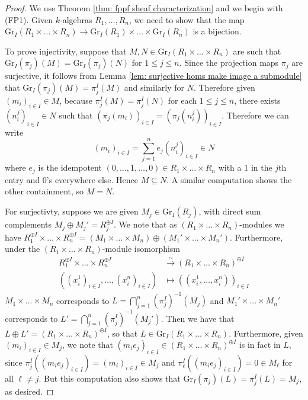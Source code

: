 \documentclass[oneside,11pt]{amsart}
\newcommand{\Gr}{\ensuremath{\text{Gr}}}
\theoremstyle{definition}
\newtheorem{proof techniques}{Proof Techniques}
\begin{document}
\begin{proof}
We use Theorem \ref{thm: fppf sheaf characterization} and we begin with (FP1). Given $k$-algebras $R_1, \ldots,  R_n$, we need to show that the map $\Gr_I( R_1 \times \ldots \times R_n ) \to \Gr_I( R_1) \times \ldots \times \Gr_I(R_n )$ is a bijection. 

To prove injectivity, suppose that $M , N \in \Gr_I( R_1 \times \ldots \times R_n )$ are such that $\Gr_I( \pi_j )(M) = \Gr_I( \pi_j )(N)$ for $1 \leq j \leq n$. Since the projection maps $\pi_j$ are surjective, it follows from Lemma \ref{lem: surjective homs make image a submodule} that $\Gr_I( \pi_j )(M) = \pi_j^I (M)$ and similarly for $N$. Therefore given $(m_i)_{i \in I} \in M$, because $\pi_j^I (M) = \pi_j^I (N)$ for each $1 \leq j \leq n$, there exists $(n^j_i)_{i \in I} \in N$ such that $(\pi_j(m_i))_{i \in I}  = (\pi_j(n^j_i))_{i \in I}$. Therefore we can write 
\begin{equation*}
(m_i)_{i\in I} = \sum_{j = 1}^n e_j (n^j_i)_{i \in I} \in N
\end{equation*}
where $e_j$ is the idempotent $(0 , \ldots, 1 , \ldots, 0) \in R_1 \times \ldots \times R_n$ with a $1$ in the $j$th entry and $0$'s everywhere else. Hence $M \subseteq N$. A similar computation shows the other containment, so $M = N$. 

For surjectivty, suppose we are given $M_j \in \Gr_I(R_j)$, with direct sum complements $M_j \oplus M_j' = R_j^{\oplus I}$. We note that as $(R_1 \times \ldots \times R_n)$-modules we have $R_1^{\oplus I} \times \ldots \times R_n^{\oplus I} = (M_1 \times \ldots \times M_n) \oplus (M_1' \times \ldots \times M_n')$. Furthermore, under the $(R_1 \times \ldots \times R_n)$-module isomorphism
\begin{align*}
R_1^{\oplus I} \times \ldots \times R_n^{\oplus I} &\overset{\sim}{\to} (R_1 \times \ldots \times R_n)^{\oplus I}
\\ ( (x_i^1)_{i \in I} , \ldots , (x_i^n)_{i \in I} ) &\mapsto ( (x^1_i , \ldots , x^n_i ) )_{i \in I}
\end{align*}
$M_1 \times \ldots \times M_n$ corresponds to $L = \bigcap_{j = 1}^n (\pi^I_j)^{-1}(M_j)$ and $M_1' \times \ldots \times M_n'$ corresponds to $L' = \bigcap_{j = 1}^n (\pi^I_j)^{-1}(M_j')$. Then we have that $L \oplus L' = (R_1 \times \ldots \times R_n)^{\oplus I}$, so that $L \in \Gr_I(R_1 \times \ldots \times R_n)$. Furthermore, given $(m_i)_{i \in I} \in M_j$, we note that $( m_i e_j )_{i \in I} \in (R_1 \times \ldots \times R_n)^{\oplus I}$ is in fact in $L$, since $\pi_j^I ( ( m_i e_j )_{i \in I} ) =  (m_i)_{i \in I} \in M_j$ and $\pi_\ell^I ( ( m_i e_j )_{i \in I} ) = 0 \in M_\ell$ for all $\ell \neq j$. But this computation also shows that $\Gr_I(\pi_j)(L) = \pi_j^I( L ) = M_j$, as desired.



\end{proof}
\end{document}
